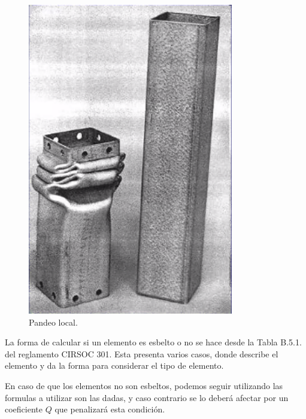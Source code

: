 \documentclass[../main.tex]{subfiles}
\begin{document}
\begin{figure}[ht]
  \centering
  \includegraphics[width=0.8\textwidth]{../images/20210419/abollamiento}
  \caption{Pandeo local.}
  \label{fig:abollamiento}
\end{figure}  

La forma de calcular si un elemento es esbelto o no se hace desde la Tabla B.5.1.
del reglamento CIRSOC 301. Esta presenta varios casos, donde describe el elemento
y da la forma para considerar el tipo de elemento. 

En caso de que los elementos no son esbeltos, podemos seguir utilizando las
formulas a utilizar son las dadas, y caso contrario se lo deberá afectar por un
coeficiente $Q$ que penalizará esta condición.
\end{document}
